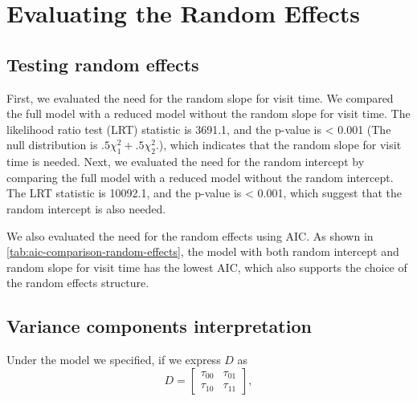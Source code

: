 \documentclass[12pt]{article}
\begin{document}
\section{Evaluating the Random Effects}

\subsection{Testing random effects}

First, we evaluated the need for the random slope for visit time.
We compared the full model with a reduced model without
the random slope for visit time.
The likelihood ratio test (LRT) statistic is 3691.1,
and the p-value is < 0.001 (The null distribution
is $.5 \chi_{1}^2 + .5 \chi_{2}^2$.),
which indicates that the random slope for visit time is needed.
Next, we evaluated the need for the random intercept
by comparing the full model with a reduced model
without the random intercept. The LRT statistic is
10092.1, and the p-value is < 0.001,
which suggest that the random intercept is also needed.

We also evaluated the need for the random effects
using AIC.
As shown in \cref{tab:aic-comparison-random-effects},
the model with both random intercept and random slope for visit time
has the lowest AIC, which also supports the choice of the random effects
structure.

\begin{table}[htbp]
\caption{AIC comparison for random-effects structures.}
\centering
{}
\label{tab:aic-comparison-random-effects}
\end{table}




\subsection{Variance components interpretation}

Under the model we specified,
if we express $D$ as
\begin{equation}
D = \begin{bmatrix}
\tau_{00} & \tau_{01} \\
\tau_{10} & \tau_{11}
\end{bmatrix},
\end{equation}
\end{document}

